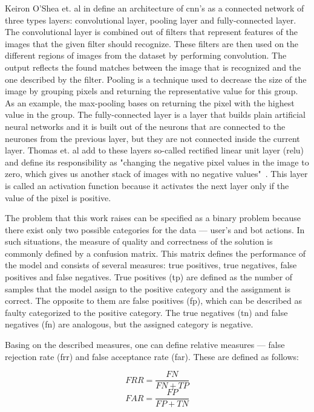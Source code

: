 Keiron O'Shea et. al in \cite{cnn-description} define an architecture of \gls{cnn}'s as a connected network of three types layers: convolutional layer, pooling layer and fully-connected layer.
The convolutional layer is combined out of filters that represent features of the images that the given filter should recognize.
These filters are then used on the different regions of images from the dataset by performing convolution.
The output reflects the found matches between the image that is recognized and the one described by the filter.
Pooling is a technique used to decrease the size of the image by grouping pixels and returning the representative value for this group.
As an example, the max-pooling bases on returning the pixel with the highest value in the group.
The fully-connected layer is a layer that builds plain artificial neural networks and it is built out of the neurons that are connected to the neurones from the previous layer, but they are not connected inside the current layer.
Thomas et. al add to these layers so-called rectified linear unit layer (\gls{relu}) and define its responsibility as "changing the negative pixel values in the image to zero, which gives us another stack of images with no negative values"~\cite{thomas2020machine}.
This layer is called an activation function because it activates the next layer only if the value of the pixel is positive.

The problem that this work raises can be specified as a binary problem because there exist only two possible categories for the data --- user's and bot actions.
In such situations, the measure of quality and correctness of the solution is commonly defined by a confusion matrix.
This matrix defines the performance of the model and consists of several measures: true positives, true negatives, false positives and false negatives.
True positives (\gls{tp}) are defined as the number of samples that the model assign to the positive category and the assignment is correct.
The opposite to them are false positives (\gls{fp}), which can be described as faulty categorized to the positive category.
The true negatives (\gls{tn}) and false negatives (\gls{fn}) are analogous, but the assigned category is negative.

Basing on the described measures, one can define relative measures --- false rejection rate (\gls{frr}) and false acceptance rate (\gls{far}).
These are defined as follows:

\begin{samepage}
\begin{equation}
    FRR = \frac{FN}{FN + TP}\label{eq:frr}
\end{equation}
\begin{equation}
    FAR = \frac{FP}{FP + TN}\label{eq:far}
\end{equation}
\end{samepage}

